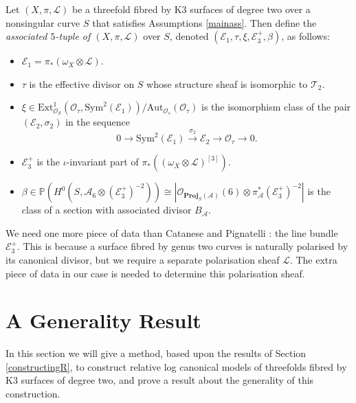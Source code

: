 \documentclass{amsart}
\begin{document}
\begin{defn} \label{5tupledefn} Let $(X,\pi,{\mathcal{L}})$ be a threefold fibred by K3 surfaces of degree two over a nonsingular curve $S$ that satisfies Assumptions \ref{mainass}. Then define the \emph{associated $5$-tuple of $(X,\pi,{\mathcal{L}})$} over $S$, denoted $({\mathcal{E}}_1,\tau,\xi,{\mathcal{E}}_3^+,\beta)$, as follows:
\begin{itemize}
\item ${\mathcal{E}}_1 = \pi_*(\omega_X \otimes {\mathcal{L}})$.
\item $\tau$ is the effective divisor on $S$ whose structure sheaf is isomorphic to ${\mathcal{T}}_2$.
\item $\xi \in \mathrm{Ext}_{{\mathcal{O}}_S}^1({\mathcal{O}}_{\tau}, {\mathrm{Sym}}^2({\mathcal{E}}_1))/\mathrm{Aut}_{{\mathcal{O}}_s}({\mathcal{O}}_{\tau})$ is the isomorphism class of the pair $({\mathcal{E}}_2,\sigma_2)$ in the sequence
\[ 0 \longrightarrow {\mathrm{Sym}}^2({\mathcal{E}}_1) \stackrel{\sigma_2}{\longrightarrow} {\mathcal{E}}_2 \longrightarrow {\mathcal{O}}_{\tau} \longrightarrow 0.\]
\item ${\mathcal{E}}_3^+$ is the $\iota$-invariant part of $\pi_*((\omega_X \otimes {\mathcal{L}})^{[3]})$.
\item $\beta \in {\mathbb{P}}(H^0(S, {\mathcal{A}}_6 \otimes ({\mathcal{E}}_3^+)^{-2})) \cong |{\mathcal{O}}_{\mathbf{Proj}_S({\mathcal{A}})}(6) \otimes \pi_{\mathcal{A}}^*({\mathcal{E}}_3^+)^{-2}|$ is the class of a section with associated divisor $B_{\mathcal{A}}$.
\end{itemize}
\end{defn}

\begin{remark} We need one more piece of data than Catanese and Pignatelli \cite{flgi}: the line bundle ${\mathcal{E}}_3^+$. This is because a surface fibred by genus two curves is naturally polarised by its canonical divisor, but we require a separate polarisation sheaf ${\mathcal{L}}$. The extra piece of data in our case is needed to determine this polarisation sheaf.
\end{remark}

\section{A Generality Result}\label{genres}

In this section we will give a method, based upon the results of Section \ref{constructingR}, to construct relative log canonical models of threefolds fibred by K3 surfaces of degree two, and prove a result about the generality of this construction.
\end{document}
